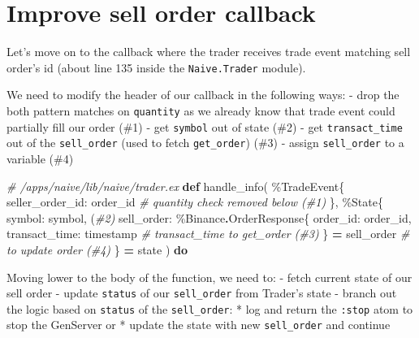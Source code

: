\documentclass[
  oneside]{book}
\newenvironment{Shaded}{\begin{snugshade}}{\end{snugshade}}
\newcommand{\CommentTok}[1]{\textcolor[rgb]{0.56,0.35,0.01}{\textit{#1}}}
\newcommand{\ConstantTok}[1]{\textcolor[rgb]{0.00,0.00,0.00}{#1}}
\newcommand{\KeywordTok}[1]{\textcolor[rgb]{0.13,0.29,0.53}{\textbf{#1}}}
\newcommand{\NormalTok}[1]{#1}
\newcommand{\OperatorTok}[1]{\textcolor[rgb]{0.81,0.36,0.00}{\textbf{#1}}}
\newcommand{\VariableTok}[1]{\textcolor[rgb]{0.00,0.00,0.00}{#1}}
\begin{document}
\hypertarget{improve-sell-order-callback}{%
\section{Improve sell order callback}\label{improve-sell-order-callback}}

Let's move on to the callback where the trader receives trade event matching sell order's id (about line 135 inside the \texttt{Naive.Trader} module).

We need to modify the header of our callback in the following ways:
- drop the both pattern matches on \texttt{quantity} as we already know that trade event could partially fill our order (\#1)
- get \texttt{symbol} out of state (\#2)
- get \texttt{transact\_time} out of the \texttt{sell\_order} (used to fetch \texttt{get\_order}) (\#3)
- assign \texttt{sell\_order} to a variable (\#4)

\begin{Shaded}
\begin{Highlighting}[]
  \CommentTok{\# /apps/naive/lib/naive/trader.ex}
  \KeywordTok{def}\NormalTok{ handle\_info(}
\NormalTok{        \%}\ConstantTok{TradeEvent}\NormalTok{\{}
          \VariableTok{seller\_order\_id:}\NormalTok{ order\_id }\CommentTok{\# \textasciigrave{}quantity\textasciigrave{} check removed below (\#1)}
\NormalTok{        \},}
\NormalTok{        \%}\ConstantTok{State}\NormalTok{\{}
          \VariableTok{symbol:}\NormalTok{ symbol, (}\CommentTok{\#2)}
          \VariableTok{sell\_order:}
\NormalTok{            \%}\ConstantTok{Binance}\OperatorTok{.}\ConstantTok{OrderResponse}\NormalTok{\{}
              \VariableTok{order\_id:}\NormalTok{ order\_id,}
              \VariableTok{transact\_time:}\NormalTok{ timestamp }\CommentTok{\# \textasciigrave{}transact\_time\textasciigrave{} to \textasciigrave{}get\_order\textasciigrave{} (\#3)}
\NormalTok{            \} }\OperatorTok{=}\NormalTok{ sell\_order }\CommentTok{\# to update order (\#4)}
\NormalTok{        \} }\OperatorTok{=}\NormalTok{ state}
\NormalTok{      ) }\KeywordTok{do}
\end{Highlighting}
\end{Shaded}

Moving lower to the body of the function, we need to:
- fetch current state of our sell order
- update \texttt{status} of our \texttt{sell\_order} from Trader's state
- branch out the logic based on \texttt{status} of the \texttt{sell\_order}:
* log and return the \texttt{:stop} atom to stop the GenServer
or
* update the state with new \texttt{sell\_order} and continue
\end{document}

